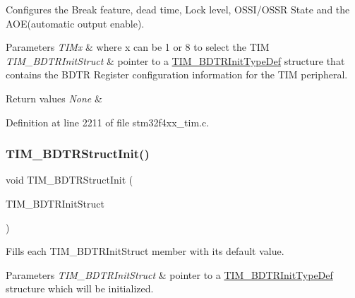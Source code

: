 Configures the Break feature, dead time, Lock level, O\+S\+S\+I/\+O\+S\+SR State and the A\+O\+E(automatic output enable). 


\begin{DoxyParams}{Parameters}
{\em T\+I\+Mx} & where x can be 1 or 8 to select the T\+IM \\
\hline
{\em T\+I\+M\+\_\+\+B\+D\+T\+R\+Init\+Struct} & pointer to a \hyperlink{struct_t_i_m___b_d_t_r_init_type_def}{T\+I\+M\+\_\+\+B\+D\+T\+R\+Init\+Type\+Def} structure that contains the B\+D\+TR Register configuration information for the T\+IM peripheral. \\
\hline
\end{DoxyParams}

\begin{DoxyRetVals}{Return values}
{\em None} & \\
\hline
\end{DoxyRetVals}


Definition at line 2211 of file stm32f4xx\+\_\+tim.\+c.

\mbox{\label{group___t_i_m_gaea0f49938cda8ae0738162194798afc6}} 
\subsubsection{\texorpdfstring{T\+I\+M\+\_\+\+B\+D\+T\+R\+Struct\+Init()}{TIM\_BDTRStructInit()}}
{\footnotesize\ttfamily void T\+I\+M\+\_\+\+B\+D\+T\+R\+Struct\+Init (\begin{DoxyParamCaption}\item[{\hyperlink{struct_t_i_m___b_d_t_r_init_type_def}{T\+I\+M\+\_\+\+B\+D\+T\+R\+Init\+Type\+Def} $\ast$}]{T\+I\+M\+\_\+\+B\+D\+T\+R\+Init\+Struct }\end{DoxyParamCaption})}



Fills each T\+I\+M\+\_\+\+B\+D\+T\+R\+Init\+Struct member with its default value. 


\begin{DoxyParams}{Parameters}
{\em T\+I\+M\+\_\+\+B\+D\+T\+R\+Init\+Struct} & pointer to a \hyperlink{struct_t_i_m___b_d_t_r_init_type_def}{T\+I\+M\+\_\+\+B\+D\+T\+R\+Init\+Type\+Def} structure which will be initialized. \\
\hline
\end{DoxyParams}

